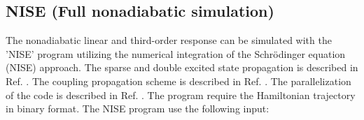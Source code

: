 \subsection{NISE (Full nonadiabatic simulation)}
The nonadiabatic linear and third-order response can be simulated with the 'NISE' program utilizing the numerical integration of the Schr\"odinger equation (NISE) approach\cite{Jansen.2006.JPCB.110.22910,Jansen.2009.ACR.42.1405}. The sparse and double excited state propagation is described in Ref. .
The coupling propagation scheme is described in Ref. . The parallelization of the code is described in Ref. .
The program require the Hamiltonian trajectory in binary format.
The NISE program use the following input:\\
